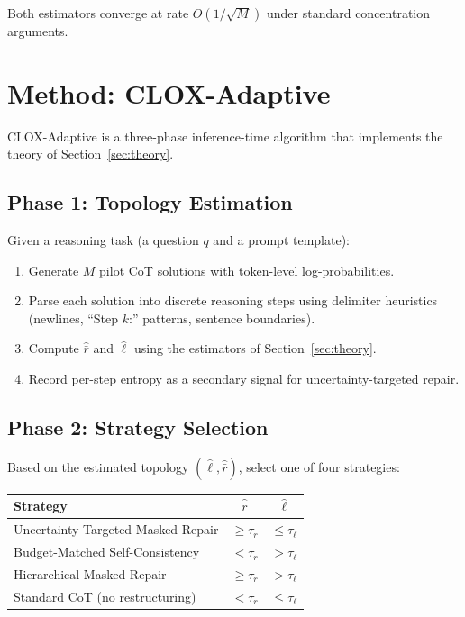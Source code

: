 \documentclass{article}
\begin{document}
Both estimators converge at rate $O(1/\sqrt{M})$ under standard concentration arguments.

\section{Method: CLOX-Adaptive}
\label{sec:method}

CLOX-Adaptive is a three-phase inference-time algorithm that implements the theory of Section~\ref{sec:theory}.

\subsection{Phase 1: Topology Estimation}

Given a reasoning task (a question $q$ and a prompt template):
\begin{enumerate}[nosep]
\item Generate $M$ pilot CoT solutions with token-level log-probabilities.
\item Parse each solution into discrete reasoning steps using delimiter heuristics (newlines, ``Step $k$:'' patterns, sentence boundaries).
\item Compute $\hat{\bar{r}}$ and $\hat{\ell}$ using the estimators of Section~\ref{sec:theory}.
\item Record per-step entropy as a secondary signal for uncertainty-targeted repair.
\end{enumerate}

\subsection{Phase 2: Strategy Selection}

Based on the estimated topology $(\hat{\ell}, \hat{\bar{r}})$, select one of four strategies:

\begin{center}
\begin{tabular}{lcc}
\toprule
\textbf{Strategy} & $\hat{\bar{r}}$ & $\hat{\ell}$ \\
\midrule
Uncertainty-Targeted Masked Repair & $\geq \tau_r$ & $\leq \tau_\ell$ \\
Budget-Matched Self-Consistency & $< \tau_r$ & $> \tau_\ell$ \\
Hierarchical Masked Repair & $\geq \tau_r$ & $> \tau_\ell$ \\
Standard CoT (no restructuring) & $< \tau_r$ & $\leq \tau_\ell$ \\
\bottomrule
\end{tabular}
\end{center}
\end{document}
